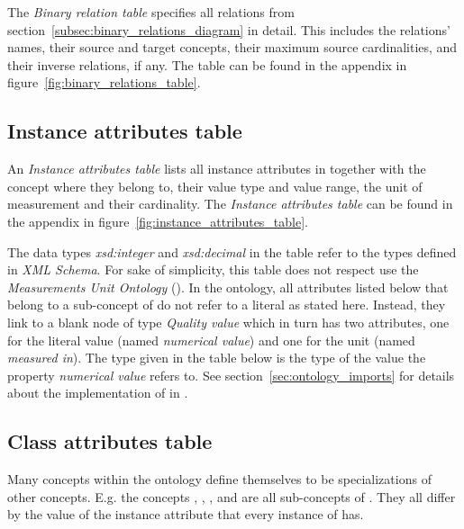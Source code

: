 The \emph{Binary relation table} specifies all relations from section~\ref{subsec:binary_relations_diagram} in detail. This includes the relations' names, their source and target concepts, their maximum source cardinalities, and their inverse relations, if any. The table can be found in the appendix in figure~\ref{fig:binary_relations_table}.

\subsection{Instance attributes table}
\label{subsec:instance_attributes_table}

An \emph{Instance attributes table} lists all instance attributes in \thinkhomeweather together with the concept where they belong to, their value type and value range, the unit of measurement and their cardinality. The \emph{Instance attributes table} can be found in the appendix in figure~\ref{fig:instance_attributes_table}.

The data types \emph{xsd:integer} and \emph{xsd:decimal} in the table refer to the types defined in \emph{XML Schema}\cite{xml-schema-datatypes}. For sake of simplicity, this table does not respect use the \emph{Measurements Unit Ontology} (\muo)\cite{MUO}. In the ontology, all attributes listed below that belong to a sub-concept of  do not refer to a literal as stated here. Instead, they link to a blank node of type \emph{Quality value} which in turn has two attributes, one for the literal value (named \emph{numerical value}) and one for the unit (named \emph{measured in}). The type given in the table below is the type of the value the property \emph{numerical value} refers to. See section~\ref{sec:ontology_imports} for details about the implementation of \muo in \thinkhomeweather.

\subsection{Class attributes table}
\label{subsec:class_attributes_table}

Many concepts within the \thinkhomeweather ontology define themselves to be specializations of other concepts. E.g. the concepts , , ,  and  are all sub-concepts of . They all differ by the value of the instance attribute  that every instance of  has.

